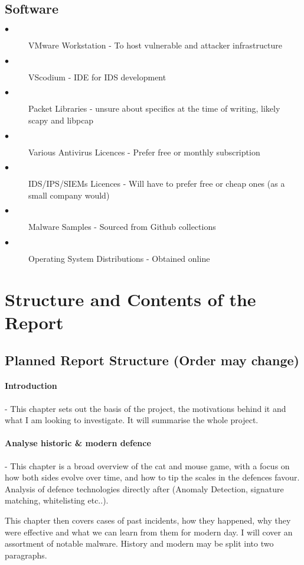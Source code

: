 \subsection{Software}
\begin{description}
	\item[$\bullet$] VMware Workstation - To host vulnerable and attacker infrastructure
	\item[$\bullet$] VScodium - IDE for IDS development
	\item[$\bullet$] Packet Libraries - unsure about specifics at the time of writing, likely scapy and libpcap
	\item[$\bullet$] Various Antivirus Licences - Prefer free or monthly subscription
	\item[$\bullet$] IDS/IPS/SIEMs Licences - Will have to prefer free or cheap ones (as a small company would)
	\item[$\bullet$] Malware Samples - Sourced from Github collections
	\item[$\bullet$] Operating System Distributions - Obtained online 
\end{description}

\section{Structure and Contents of the Report}
\subsection{Planned Report Structure (Order may change)}


\paragraph{Introduction} - This chapter sets out the basis of the project, the motivations behind it and what I am looking to investigate. 
It will summarise the whole project.

\paragraph{Analyse historic \& modern defence} - This chapter is a broad overview of the cat and mouse game, with a focus on how both sides evolve over time, 
and how to tip the scales in the defences favour. Analysis of defence technologies directly after (Anomaly Detection, signature matching, whitelisting etc..). 

This chapter then covers cases of past incidents, how they happened, why they were effective and what we can learn from them for modern day. 
I will cover an assortment of notable malware. History and modern may be split into two paragraphs.

